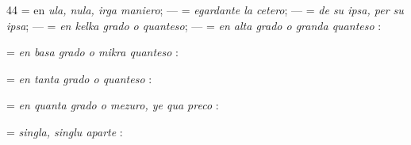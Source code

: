 \begin{VUpage}[48]{44}
\VUblancAlinea
{} = en \textit{ula, nula, irga maniero}; ---\nl
{} = \textit{egardante la cetero}; ---  = \textit{de su ipsa, per su}\nl
\textit{ipsa}; ---  = \textit{en kelka grado o quanteso}; ---  =\nl
\textit{en alta grado o granda quanteso} : \nl
{}

\VUblancAlinea
{} = \textit{en basa grado o mikra quanteso} : \nl
{}

\VUblancAlinea
{} = \textit{en tanta grado o quanteso} : \nl
{}\cc
{}

\VUblancAlinea
{} = \textit{en quanta grado o mezuro, ye qua preco} :\nl
{}\nl
{}

\VUblancAlinea
{} = \textit{singla, singlu aparte} : \nl
{}
\end{VUpage}

